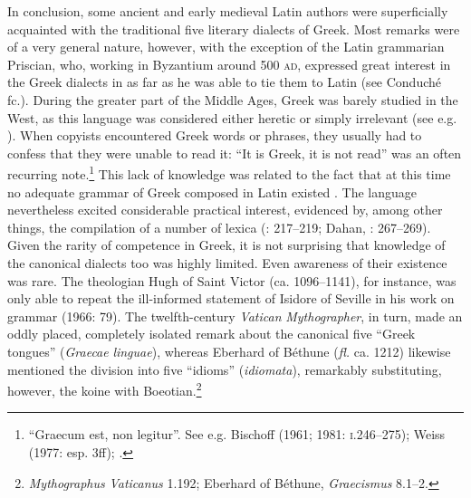 \documentclass[output=paper]{langsci/langscibook}
\begin{document}
In conclusion, some ancient and early medieval Latin authors were superficially acquainted with the traditional five literary dialects of Greek. Most remarks were of a very general nature, however, with the exception of the Latin grammarian Priscian, who, working in Byzantium around 500 \textsc{ad}, expressed great interest in the Greek dialects in as far as he was able to tie them to Latin (see Conduché fc.). During the greater part of the Middle Ages, Greek was barely studied in the West, as this language was considered either heretic or simply irrelevant (see e.g. \citealt{Boulhol2014}). When copyists encountered Greek words or phrases, they usually had to confess that they were unable to read it: “It is Greek, it is not read” was an often recurring note.\footnote{ “Graecum est, non legitur”. \textrm{See e.g. Bischoff (1961; 1981:} \textrm{\textsc{i.}}\textrm{246–275); Weiss (1977: esp. 3ff);}\textrm{ }\textrm{\citet[36]{Saladin2000}.}} This lack of knowledge was related to the fact that at this time no adequate grammar of Greek composed in Latin existed \citep[215]{Bischoff1961}. The language nevertheless excited considerable practical interest, evidenced by, among other things, the compilation of a number of lexica (\citealt{Bischoff1961}: 217–219; Dahan, \citealt{RosierValente1995}: 267–269). Given the rarity of competence in Greek, it is not surprising that knowledge of the canonical dialects too was highly limited. Even awareness of their existence was rare. The theologian Hugh of Saint Victor (ca. 1096–1141), for instance, was only able to repeat the ill-informed statement of Isidore of Seville in his work on grammar (1966: 79). The twelfth-century \textit{Vatican} \textit{Mythographer}, in turn, made an oddly placed, completely isolated remark about the canonical five “Greek tongues” (\textit{Graecae} \textit{linguae}), whereas Eberhard of Béthune (\textit{fl.} ca. 1212) likewise mentioned the division into five “idioms” (\textit{idiomata}), remarkably substituting, however, the koine with Boeotian.\footnote{\textit{Mythographus} \textit{Vaticanus} 1.192; Eberhard of Béthune, \textit{Graecismus} 8.1–2.}
\end{document}
